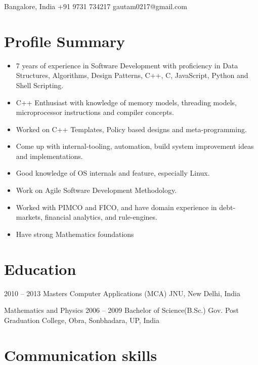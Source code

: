 \documentclass{tccv}
\begin{document}
\personal
    {Bangalore, India}
    {+91 9731 734217}
    {gautam0217@gmail.com}
    
\section{Profile Summary}
\begin{itemize}
    \item{7 years of experience in Software Development with proficiency in Data Structures, Algorithms, Design Patterns, C++, C, JavaScript, Python and Shell Scripting.}
    \item{C++ Enthusiast with knowledge of memory models, threading models, microprocessor instructions and compiler concepts.}
    \item{Worked on C++ Templates, Policy based designs and meta-programming.}
    \item{Come up with internal-tooling, automation, build system improvement ideas and implementations.}
    \item{Good knowledge of OS internals and feature, especially Linux.}
    \item{Work on Agile Software Development Methodology.}
    \item{Worked with PIMCO and FICO, and have domain experience in debt-markets, financial
analytics, and rule-engines.}
    \item{Have strong Mathematics foundations}
\end{itemize}

\section{Education}

\begin{yearlist}

\item {2010 -- 2013}
     {Masters Computer Applications (MCA)}
     {JNU, New Delhi, India}

\item[Mathematics and Physics]{2006 -- 2009}
    {Bachelor of Science(B.Sc.)}
    {Gov. Post Graduation College, Obra, Sonbhadara, UP, India}

\end{yearlist}

\section{Communication skills}
\end{document}
